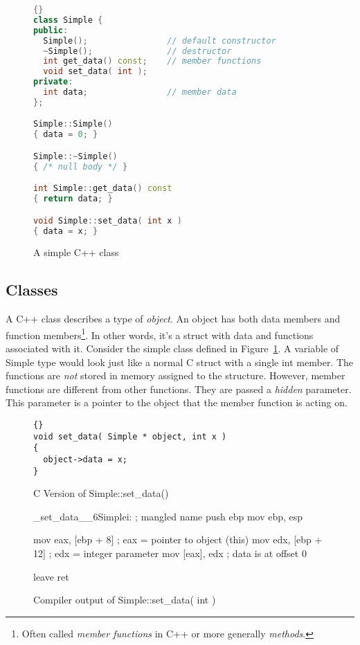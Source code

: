\begin{figure}[t]
\begin{lstlisting}[language=C++,frame=tlrb]{}
class Simple {
public:
  Simple();                // default constructor
  ~Simple();               // destructor
  int get_data() const;    // member functions
  void set_data( int );
private:
  int data;                // member data
};

Simple::Simple()
{ data = 0; }

Simple::~Simple()
{ /* null body */ }

int Simple::get_data() const
{ return data; }

void Simple::set_data( int x )
{ data = x; }
\end{lstlisting}
\caption{A simple C++ class\label{fig:SimpleClass}}
\end{figure}

\subsection{Classes}

A C++ class describes a type of \emph{object}. An object has both data
members and function members\footnote{Often called \emph{member
functions} in C++ or more generally \emph{methods}.}. In other words,
it's a {\code struct} with data and functions associated with
it. Consider the simple class defined in
Figure~\ref{fig:SimpleClass}. A variable of {\code Simple} type would
look just like a normal C {\code struct} with a single {\code int}
member.   The functions are \emph{not} stored in memory assigned to
the structure. However, member functions are different from other
functions. They are passed a \emph{hidden} parameter. This parameter
is a pointer to the object that the member function is acting on.

\begin{figure}[t]
\begin{lstlisting}[stepnumber=0]{}
void set_data( Simple * object, int x )
{
  object->data = x;
}
\end{lstlisting}
\caption{C Version of Simple::set\_data()\label{fig:SimpleCVer}}
\end{figure}


\begin{figure}[t]
\begin{AsmCodeListing}
_set_data__6Simplei:           ; mangled name
      push   ebp
      mov    ebp, esp

      mov    eax, [ebp + 8]   ; eax = pointer to object (this)
      mov    edx, [ebp + 12]  ; edx = integer parameter
      mov    [eax], edx       ; data is at offset 0

      leave
      ret
\end{AsmCodeListing}
\caption{Compiler output of Simple::set\_data( int ) \label{fig:SimpleAsm}}
\end{figure}


